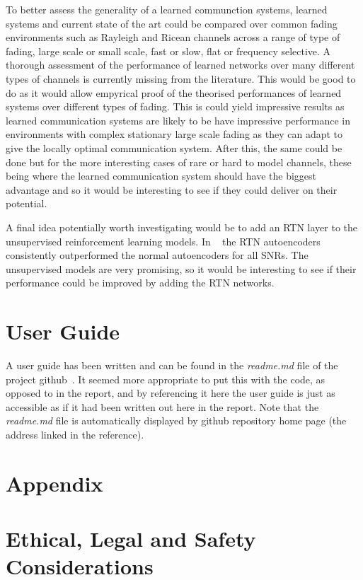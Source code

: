 \documentclass[12pt,onecolumn,letterpaper]{article}
\newcommand{\code}{\textit}
\begin{document}
To better assess the generality of a learned communction systems, learned systems and current state of the art could be compared over common fading environments such as Rayleigh and Ricean channels across a range of type of fading, large scale or small scale, fast or slow, flat or frequency selective. A thorough assessment of the performance of learned networks over many different types of channels is currently missing from the literature. This would be good to do as it would allow empyrical proof of the theorised performances of learned systems over different types of fading. This is could yield impressive results as learned communication systems are likely to be have impressive performance in environments with complex stationary large scale fading as they can adapt to give the locally optimal communication system. After this, the same could be done but for the more interesting cases of rare or hard to model channels, these being where the learned communication system should have the biggest advantage and so it would be interesting to see if they could deliver on their potential.

A final idea potentially worth investigating would be to add an RTN layer to the unsupervised reinforcement learning models. In ~\cite{oShea} the RTN autoencoders consistently outperformed the normal autoencoders for all SNRs. The unsupervised models are very promising, so it would be interesting to see if their performance could be improved by adding the RTN networks.

\section{User Guide}

A user guide has been written and can be found in the \code{readme.md} file of the project github~\cite{AwGithub}. It seemed more appropriate to put this with the code, as opposed to in the report, and by referencing it here the user guide is just as accessible as if it had been written out here in the report. Note that the \code{readme.md} file is automatically displayed by github repository home page (the address linked in the reference).

\FloatBarrier
\appendix
\section{Appendix}

\section{Ethical, Legal and Safety Considerations}
\end{document}
